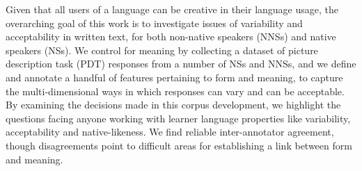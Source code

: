 Given that all users of a language can be creative in their language usage, the overarching goal of this work is to investigate issues of variability and acceptability in written text, for both non-native speakers (NNSs) and native speakers (NSs).  We control for meaning by collecting a dataset of picture description task (PDT) responses from a number of NSs and NNSs, and we define and annotate a handful of features pertaining to form and meaning, to capture the multi-dimensional ways in which responses can vary and can be acceptable.  By examining the decisions made in this corpus development, we highlight the questions facing anyone working with learner language properties like variability, acceptability and native-likeness.  We find reliable inter-annotator agreement, though disagreements point to difficult areas for establishing a link between form and meaning.
